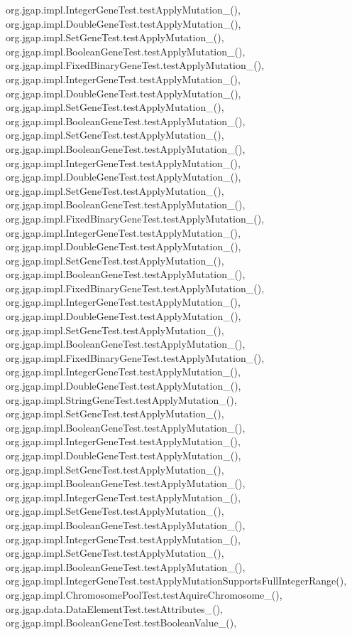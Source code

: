 org.\-jgap.\-impl.\-Integer\-Gene\-Test.\-test\-Apply\-Mutation\-\_(), org.\-jgap.\-impl.\-Double\-Gene\-Test.\-test\-Apply\-Mutation\-\_(), org.\-jgap.\-impl.\-Set\-Gene\-Test.\-test\-Apply\-Mutation\-\_(), org.\-jgap.\-impl.\-Boolean\-Gene\-Test.\-test\-Apply\-Mutation\-\_(), org.\-jgap.\-impl.\-Fixed\-Binary\-Gene\-Test.\-test\-Apply\-Mutation\-\_(), org.\-jgap.\-impl.\-Integer\-Gene\-Test.\-test\-Apply\-Mutation\-\_(), org.\-jgap.\-impl.\-Double\-Gene\-Test.\-test\-Apply\-Mutation\-\_(), org.\-jgap.\-impl.\-Set\-Gene\-Test.\-test\-Apply\-Mutation\-\_(), org.\-jgap.\-impl.\-Boolean\-Gene\-Test.\-test\-Apply\-Mutation\-\_(), org.\-jgap.\-impl.\-Set\-Gene\-Test.\-test\-Apply\-Mutation\-\_(), org.\-jgap.\-impl.\-Boolean\-Gene\-Test.\-test\-Apply\-Mutation\-\_(), org.\-jgap.\-impl.\-Integer\-Gene\-Test.\-test\-Apply\-Mutation\-\_(), org.\-jgap.\-impl.\-Double\-Gene\-Test.\-test\-Apply\-Mutation\-\_(), org.\-jgap.\-impl.\-Set\-Gene\-Test.\-test\-Apply\-Mutation\-\_(), org.\-jgap.\-impl.\-Boolean\-Gene\-Test.\-test\-Apply\-Mutation\-\_(), org.\-jgap.\-impl.\-Fixed\-Binary\-Gene\-Test.\-test\-Apply\-Mutation\-\_(), org.\-jgap.\-impl.\-Integer\-Gene\-Test.\-test\-Apply\-Mutation\-\_(), org.\-jgap.\-impl.\-Double\-Gene\-Test.\-test\-Apply\-Mutation\-\_(), org.\-jgap.\-impl.\-Set\-Gene\-Test.\-test\-Apply\-Mutation\-\_(), org.\-jgap.\-impl.\-Boolean\-Gene\-Test.\-test\-Apply\-Mutation\-\_(), org.\-jgap.\-impl.\-Fixed\-Binary\-Gene\-Test.\-test\-Apply\-Mutation\-\_(), org.\-jgap.\-impl.\-Integer\-Gene\-Test.\-test\-Apply\-Mutation\-\_(), org.\-jgap.\-impl.\-Double\-Gene\-Test.\-test\-Apply\-Mutation\-\_(), org.\-jgap.\-impl.\-Set\-Gene\-Test.\-test\-Apply\-Mutation\-\_(), org.\-jgap.\-impl.\-Boolean\-Gene\-Test.\-test\-Apply\-Mutation\-\_(), org.\-jgap.\-impl.\-Fixed\-Binary\-Gene\-Test.\-test\-Apply\-Mutation\-\_(), org.\-jgap.\-impl.\-Integer\-Gene\-Test.\-test\-Apply\-Mutation\-\_(), org.\-jgap.\-impl.\-Double\-Gene\-Test.\-test\-Apply\-Mutation\-\_(), org.\-jgap.\-impl.\-String\-Gene\-Test.\-test\-Apply\-Mutation\-\_(), org.\-jgap.\-impl.\-Set\-Gene\-Test.\-test\-Apply\-Mutation\-\_(), org.\-jgap.\-impl.\-Boolean\-Gene\-Test.\-test\-Apply\-Mutation\-\_(), org.\-jgap.\-impl.\-Integer\-Gene\-Test.\-test\-Apply\-Mutation\-\_(), org.\-jgap.\-impl.\-Double\-Gene\-Test.\-test\-Apply\-Mutation\-\_(), org.\-jgap.\-impl.\-Set\-Gene\-Test.\-test\-Apply\-Mutation\-\_(), org.\-jgap.\-impl.\-Boolean\-Gene\-Test.\-test\-Apply\-Mutation\-\_(), org.\-jgap.\-impl.\-Integer\-Gene\-Test.\-test\-Apply\-Mutation\-\_(), org.\-jgap.\-impl.\-Set\-Gene\-Test.\-test\-Apply\-Mutation\-\_(), org.\-jgap.\-impl.\-Boolean\-Gene\-Test.\-test\-Apply\-Mutation\-\_(), org.\-jgap.\-impl.\-Integer\-Gene\-Test.\-test\-Apply\-Mutation\-\_(), org.\-jgap.\-impl.\-Set\-Gene\-Test.\-test\-Apply\-Mutation\-\_(), org.\-jgap.\-impl.\-Boolean\-Gene\-Test.\-test\-Apply\-Mutation\-\_(), org.\-jgap.\-impl.\-Integer\-Gene\-Test.\-test\-Apply\-Mutation\-Supports\-Full\-Integer\-Range(), org.\-jgap.\-impl.\-Chromosome\-Pool\-Test.\-test\-Aquire\-Chromosome\-\_(), org.\-jgap.\-data.\-Data\-Element\-Test.\-test\-Attributes\-\_(), org.\-jgap.\-impl.\-Boolean\-Gene\-Test.\-test\-Boolean\-Value\-\_(), 